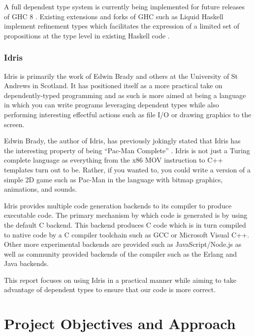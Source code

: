 \documentclass[a4paper, notitlepage]{report}
\begin{document}
A full dependent type system is currently being implemented for future releases
of GHC 8 \cite{eisenberg_dependent_2016,weirich_specif_2017}. Existing extensions
and forks of GHC such as Liquid Haskell implement refinement types which
facilitates the expression of a limited set of propositions at the type level in
existing Haskell code \cite{vazou_refinement_2014}.

\subsection{Idris}
\label{sec:orgce5951a}
Idris is primarily the work of Edwin Brady and others at the University of St
Andrews in Scotland. It has positioned itself as a more practical take on
dependently-typed programming and as such is more aimed at being a language in
which you can write programs leveraging dependent types while also performing
interesting effectful actions such as file I/O or drawing graphics to the
screen.

Edwin Brady, the author of Idris, has previously jokingly stated that Idris has
the interesting property of being ``Pac-Man Complete'' \cite{scala_world_2015}.
Idris is not just a Turing complete language as everything from the x86 MOV
instruction \cite{dolan_mov_2013} to C++ templates \cite{veldhuizen_templates_2003}
turn out to be. Rather, if you wanted to, you could write a version of a simple
2D game such as Pac-Man in the language with bitmap graphics, animations, and
sounds.

Idris provides multiple code generation backends to its compiler to produce
executable code. The primary mechanism by which code is generated is by using
the default C backend. This backend produces C code which is in turn compiled to
native code by a C compiler toolchain such as GCC or Microsoft Visual C++. Other
more experimental backends are provided such as JavaScript/Node.js as well as
community provided backends of the compiler such as the Erlang
\cite{elliott_erlang_2015} and Java \cite{idris_java} backends.

This report focuses on using Idris in a practical manner while aiming to take
advantage of dependent types to ensure that our code is more correct.
\chapter{Project Objectives and Approach}
\label{sec:org3640f8a}
\end{document}
